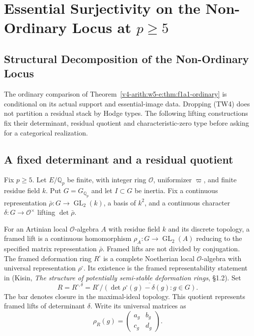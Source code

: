 \section{Essential Surjectivity on the Non-Ordinary Locus at $p\ge5$}
\label{v4-arith:w6-e:non-ord}

\subsection{Structural Decomposition of the Non-Ordinary Locus}

The ordinary comparison of
Theorem~\ref{v4-arith:w5-e:thm:f1a1-ordinary} is conditional on its
actual support and essential-image data. Dropping (TW4) does not
partition a residual stack by Hodge types. The following lifting
constructions fix their determinant, residual quotient and
characteristic-zero type before asking for a categorical realization.
\subsection{A fixed determinant and a residual quotient}

Fix $p\ge5$. Let $E/\mathbb Q_p$ be finite, with integer ring
$\mathcal O$, uniformizer $\varpi$, and finite residue field $k$.
Put $G=G_{\mathbb Q_p}$ and let $I\subset G$ be inertia.
Fix a continuous representation
$\bar\rho:G\to\operatorname{GL}_2(k)$, a basis of $k^2$, and a
continuous character $\delta:G\to\mathcal O^\times$ lifting
$\det\bar\rho$.

For an Artinian local $\mathcal O$-algebra $A$ with residue field $k$ and its discrete topology,
a framed lift is a continuous homomorphism
$\rho_A:G\to\operatorname{GL}_2(A)$ reducing to the specified matrix
representation $\bar\rho$. Framed lifts are not divided by conjugation.
The framed deformation ring $R^\square$ is a complete Noetherian
local $\mathcal O$-algebra with universal representation
$\rho^\square$. Its existence is the framed representability statement
in (Kisin, \emph{The structure of potentially semi-stable deformation rings}, \S1.2).
Set
\[
 R=R^{\square,\delta}
 =R^\square/\overline{(\det\rho^\square(g)-\delta(g):g\in G)}.
\]
The bar denotes closure in the maximal-ideal topology.
This quotient represents framed lifts of determinant $\delta$.
Write its universal matrices as
\[
 \rho_R(g)=\begin{pmatrix}a_g&b_g\\c_g&d_g\end{pmatrix}.
\]

